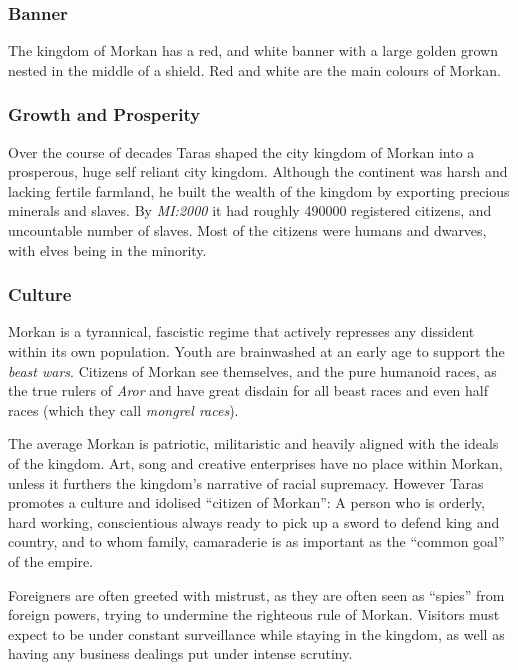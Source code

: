 \subsubsection*{Banner}

The kingdom of Morkan has a red, and white banner with a large golden grown
nested in the middle of a shield. Red and white are the main colours of
Morkan.

\subsubsection*{Growth and Prosperity}

Over the course of decades Taras shaped the city kingdom of Morkan into a
prosperous, huge self reliant city kingdom. Although the continent was harsh
and lacking fertile farmland, he built the wealth of the kingdom by exporting
precious minerals and slaves. By \emph{MI:2000} it had roughly 490000
registered citizens, and uncountable number of slaves. Most of the citizens
were humans and dwarves, with elves being in the minority.

\subsubsection*{Culture}

Morkan is a tyrannical, fascistic regime that actively represses any dissident
within its own population. Youth are brainwashed at an early age to support
the \emph{beast wars}. Citizens of Morkan see themselves, and the pure
humanoid races, as the true rulers of \emph{Aror} and have great disdain for
all beast races and even half races (which they call \emph{mongrel races}).

The average Morkan is patriotic, militaristic and heavily aligned with the
ideals of the kingdom. Art, song and creative enterprises have no place within
Morkan, unless it furthers the kingdom's narrative of racial supremacy. However
Taras promotes a culture and idolised ``citizen of Morkan'': A person who is
orderly, hard working, conscientious always ready to pick up a sword to defend
king and country, and to whom family, camaraderie is as important as the
``common goal'' of the empire.

Foreigners are often greeted with mistrust, as they are often seen as
``spies'' from foreign powers, trying to undermine the righteous rule of
Morkan. Visitors must expect to be under constant surveillance while staying
in the kingdom, as well as having any business dealings put under intense
scrutiny.

